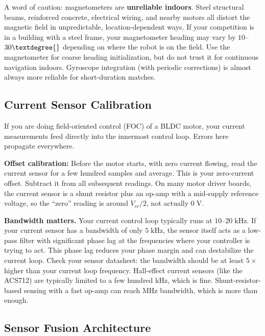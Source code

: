 A word of caution: magnetometers are \textbf{unreliable indoors}. Steel structural beams, reinforced concrete, electrical wiring, and nearby motors all distort the magnetic field in unpredictable, location-dependent ways. If your competition is in a building with a steel frame, your magnetometer heading may vary by $10$--$30\textdegree{}$ depending on where the robot is on the field. Use the magnetometer for coarse heading initialization, but do not trust it for continuous navigation indoors. Gyroscope integration (with periodic corrections) is almost always more reliable for short-duration matches.

\subsection{Current Sensor Calibration}

If you are doing field-oriented control (FOC) of a BLDC motor, your current measurements feed directly into the innermost control loop. Errors here propagate everywhere.

\textbf{Offset calibration:} Before the motor starts, with zero current flowing, read the current sensor for a few hundred samples and average. This is your zero-current offset. Subtract it from all subsequent readings. On many motor driver boards, the current sensor is a shunt resistor plus an op-amp with a mid-supply reference voltage, so the ``zero'' reading is around $V_{cc}/2$, not actually $0\;\mathrm{V}$.

\textbf{Bandwidth matters.} Your current control loop typically runs at $10$--$20\;\mathrm{kHz}$. If your current sensor has a bandwidth of only $5\;\mathrm{kHz}$, the sensor itself acts as a low-pass filter with significant phase lag at the frequencies where your controller is trying to act. This phase lag reduces your phase margin and can destabilize the current loop. Check your sensor datasheet: the bandwidth should be at least $5\times$ higher than your current loop frequency. Hall-effect current sensors (like the ACS712) are typically limited to a few hundred kHz, which is fine. Shunt-resistor-based sensing with a fast op-amp can reach MHz bandwidth, which is more than enough.

\subsection{Sensor Fusion Architecture}

